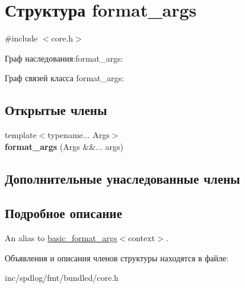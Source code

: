 \hypertarget{structformat__args}{}\section{Структура format\+\_\+args}
\label{structformat__args}


{\ttfamily \#include $<$core.\+h$>$}



Граф наследования\+:format\+\_\+args\+:


Граф связей класса format\+\_\+args\+:
\subsection*{Открытые члены}
\begin{DoxyCompactItemize}
\item 
\mbox{\label{structformat__args_a136b003264cb9272efc34495cda085c9}} 
{\footnotesize template$<$typename... Args$>$ }\\{\bfseries format\+\_\+args} (Args \&\&... args)
\end{DoxyCompactItemize}
\subsection*{Дополнительные унаследованные члены}


\subsection{Подробное описание}
An alias to {\ttfamily \hyperlink{classbasic__format__args}{basic\+\_\+format\+\_\+args}$<$context$>$}. 

Объявления и описания членов структуры находятся в файле\+:\begin{DoxyCompactItemize}
\item 
inc/spdlog/fmt/bundled/core.\+h\end{DoxyCompactItemize}
